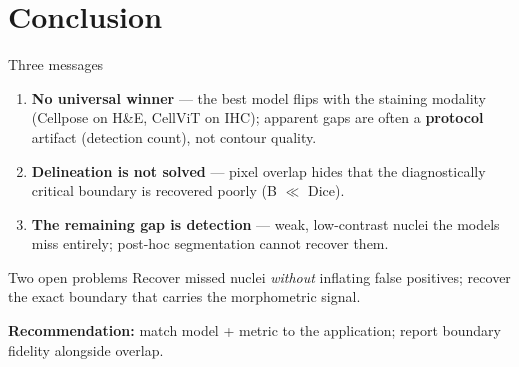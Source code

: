 \section{Conclusion}

\begin{frame}{Three messages}
    \begin{enumerate}
        \item \textbf{No universal winner} --- the best model flips with the staining modality (Cellpose on H\&E, CellViT on IHC); apparent gaps are often a \textbf{protocol} artifact (detection count), not contour quality.
        \item \textbf{Delineation is not solved} --- pixel overlap hides that the diagnostically critical boundary is recovered poorly (B $\ll$ Dice).
        \item \textbf{The remaining gap is detection} --- weak, low-contrast nuclei the models miss entirely; post-hoc segmentation cannot recover them.
    \end{enumerate}

    \vspace{0.4em}
    \begin{block}{Two open problems}
        Recover missed nuclei \emph{without} inflating false positives; recover the exact boundary that carries the morphometric signal.
    \end{block}
    \centering
    \footnotesize\textbf{Recommendation:} match model + metric to the application; report boundary fidelity alongside overlap.
\end{frame}
